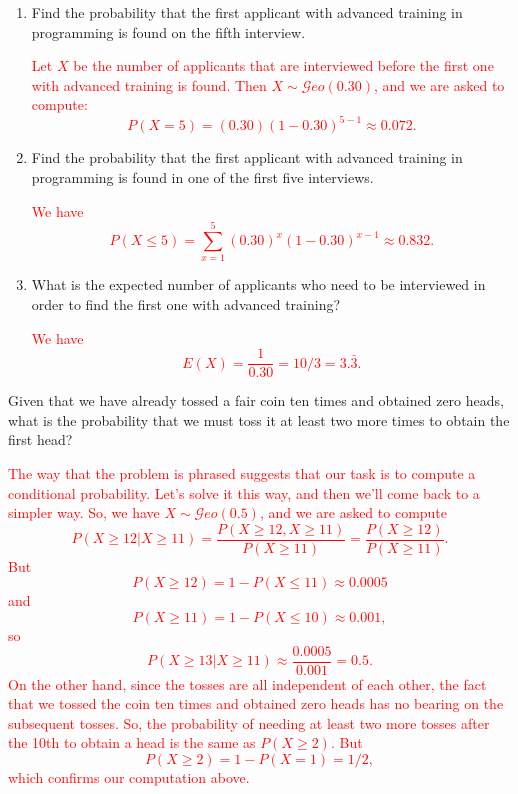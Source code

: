 \documentclass[12pt,reqno]{amsart}
\begin{document}
\medskip
\begin{enumerate}
\item Find the probability that the first applicant with advanced training in programming is found on the fifth interview.

\bigskip
\textcolor{red}{Let $X$ be the number of applicants that are interviewed before the first one with advanced training is found. Then $X\sim \mathcal{G}eo(0.30)$, and we are asked to compute:
	\[P(X=5) = (0.30)(1-0.30)^{5-1} \approx 0.072.
	\]}
\bigskip

\item Find the probability that the first applicant with advanced training in programming is found in one of the first five interviews.

\bigskip
\textcolor{red}{We have
	\[P(X\leq 5) = \sum_{x=1}^5 (0.30)^x(1-0.30)^{x-1} \approx 0.832.
	\]}
\bigskip

\item What is the expected number of applicants who need to be interviewed in order to find the first one with advanced training?

\bigskip
\textcolor{red}{We have
	\[E(X) = \frac{1}{0.30} = 10/3 = 3.\bar{3}.
	\]}
\end{enumerate}













\bigskip
\prob Given that we have already tossed a fair coin ten times and obtained zero heads, what is the probability that we must toss it at least two more times to obtain the first head?

\bigskip
\textcolor{red}{The way that the problem is phrased suggests that our task is to compute a conditional probability. Let's solve it this way, and then we'll come back to a simpler way. So, we have $X\sim \mathcal{G}eo(0.5)$, and we are asked to compute
	\[P(X\geq 12 |X\geq 11) = \frac{P(X\geq 12, X\geq 11)}{P(X\geq 11)} = \frac{P(X\geq 12)}{P(X\geq 11)}.
	\]
But
	\[P(X\geq 12) = 1 - P(X\leq 11) \approx 0.0005 
	\]
and
	\[P(X\geq 11) = 1 - P(X\leq 10) \approx 0.001,
	\]
so
	\[P(X\geq 13 |X\geq 11) \approx \frac{0.0005}{0.001} = 0.5.
	\]
On the other hand, since the tosses are all independent of each other, the fact that we tossed the coin ten times and obtained zero heads has no bearing on the subsequent tosses. So, the probability of needing at least two more tosses after the 10th to obtain a head is the same as $P(X\geq 2)$. But
	\[P(X\geq 2) = 1 - P(X=1) = 1/2,
	\]
which confirms our computation above.}
\bigskip
\end{document}
